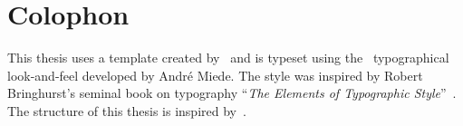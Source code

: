 \pagestyle{empty}

\hfill

\vfill

\section*{Colophon}
This thesis uses a template created by~ and is typeset using the~\cite{classicthesis} typographical look-and-feel developed by Andr\'e Miede.
The style was inspired by Robert Bringhurst's seminal book on typography \enquote{\emph{The Elements of Typographic Style}}~\autocite{Bringhurst2008}.
The structure of this thesis is inspired by~\cite{Holthaus,Wienke2018a}.
